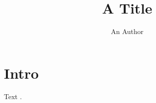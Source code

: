 \documentclass{jgcc}
\title{A Title}
\author{An Author}
\begin{document}
\maketitle
\section{Intro}
Text \jgccextra.
\end{document}
